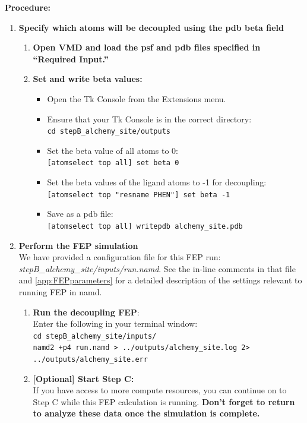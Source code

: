\documentclass[9pt,tutorial,pubversion]{Styling/livecoms}
\newcommand{\filepath}[1]{\textit{#1}}
\newcommand{\textInput}[1]{\texttt{#1}}
\begin{document}
\noindent\textbf{Procedure:}
\begin{enumerate}
    \item \textbf{Specify which atoms will be decoupled using the pdb beta field}\label{step:makeFEPpdbSite} 
        \begin{enumerate}[label=\alph*., ref=\theenumi.\alph*]
            \item \textbf{Open VMD and load the psf and pdb files specified in ``Required Input.''}
            \item \textbf{Set and write beta values:}
            \begin{itemize}
                \item Open the Tk Console from the Extensions menu.
                \item Ensure that your Tk Console is in the correct directory:\\
                \textInput{cd stepB\_alchemy\_site/outputs}
                \item Set the beta value of all atoms to 0:\\
                \textInput{[atomselect top all] set beta 0}
                \item Set the beta values of the ligand atoms to -1 for decoupling:\\
                \textInput{[atomselect top "resname PHEN"] set beta -1}
                \item Save as a pdb file:\\
                \textInput{[atomselect top all] writepdb alchemy\_site.pdb}
            \end{itemize}
        \end{enumerate}

    \item \textbf{Perform the FEP simulation}\\
    We have provided a configuration file for this FEP run: \filepath{stepB\_alchemy\_site/inputs/run.namd}. See the in-line comments in that file and \ref{app:FEPparameters} for a detailed description of the settings relevant to running FEP in namd.
    \begin{enumerate}[label=\alph*., ref=\theenumi.\alph*]     
         \item \textbf{Run the decoupling FEP}:\\
         Enter the following in your terminal window:\\
            \textInput{cd stepB\_alchemy\_site/inputs/}\\
            \textInput{namd2 +p4 run.namd > ../outputs/alchemy\_site.log 2> ../outputs/alchemy\_site.err}
        \item \textbf{[Optional] Start Step C:}\\
        If you have access to more compute resources, you can continue on to Step C while this FEP calculation is running. \textbf{Don't forget to return to analyze these data once the simulation is complete.} 
    \end{enumerate}
    

\end{enumerate}
\end{document}
